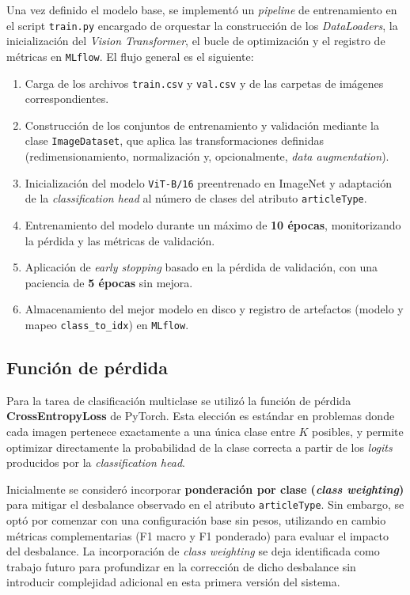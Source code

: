Una vez definido el modelo base, se implementó un \textit{pipeline} de entrenamiento en el script \texttt{train.py} encargado de orquestar la construcción de los \textit{DataLoaders}, la inicialización del \textit{Vision Transformer}, el bucle de optimización y el registro de métricas en \texttt{MLflow}. El flujo general es el siguiente:

\begin{enumerate}
    \item Carga de los archivos \texttt{train.csv} y \texttt{val.csv} y de las carpetas de imágenes correspondientes.
    \item Construcción de los conjuntos de entrenamiento y validación mediante la clase \texttt{ImageDataset}, que aplica las transformaciones definidas (redimensionamiento, normalización y, opcionalmente, \textit{data augmentation}).
    \item Inicialización del modelo \texttt{ViT-B/16} preentrenado en ImageNet y adaptación de la \textit{classification head} al número de clases del atributo \texttt{articleType}.
    \item Entrenamiento del modelo durante un máximo de \textbf{10 épocas}, monitorizando la pérdida y las métricas de validación.
    \item Aplicación de \textit{early stopping} basado en la pérdida de validación, con una paciencia de \textbf{5 épocas} sin mejora.
    \item Almacenamiento del mejor modelo en disco y registro de artefactos (modelo y mapeo \texttt{class\_to\_idx}) en \texttt{MLflow}.
\end{enumerate}

\subsection{Función de pérdida}

Para la tarea de clasificación multiclase se utilizó la función de pérdida \textbf{CrossEntropyLoss} de PyTorch. Esta elección es estándar en problemas donde cada imagen pertenece exactamente a una única clase entre $K$ posibles, y permite optimizar directamente la probabilidad de la clase correcta a partir de los \textit{logits} producidos por la \textit{classification head}.

Inicialmente se consideró incorporar \textbf{ponderación por clase (\textit{class weighting})} para mitigar el desbalance observado en el atributo \texttt{articleType}. Sin embargo, se optó por comenzar con una configuración base sin pesos, utilizando en cambio métricas complementarias (F1 macro y F1 ponderado) para evaluar el impacto del desbalance. La incorporación de \textit{class weighting} se deja identificada como trabajo futuro para profundizar en la corrección de dicho desbalance sin introducir complejidad adicional en esta primera versión del sistema.

